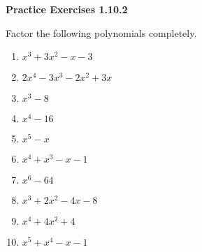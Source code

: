 \vspace{0.3ex}
\noindent\textbf{Practice Exercises 1.10.2}

\vspace{0.2ex}

Factor the following polynomials completely.
\begin{multicols}{2}
\begin{enumerate}
    \item $x^3 + 3x^2 - x - 3$
    \item $2x^4 - 3x^3 - 2x^2 + 3x$
    \item $x^3 - 8$
    \item $x^4 - 16$
    \item $x^5 - x$
    \item $x^4 + x^3 - x - 1$
    \item $x^6 - 64$
    \item $x^3 + 2x^2 - 4x - 8$
    \item $x^4 + 4x^2 + 4$
    \item $x^5 + x^4 - x - 1$
\end{enumerate}
\end{multicols}
